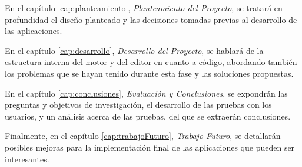 \medskip

En el capítulo \ref{cap:planteamiento}, \textit{Planteamiento del Proyecto}, se tratará en profundidad el diseño planteado y las decisiones tomadas previas al desarrollo de las aplicaciones.

\medskip

En el capítulo \ref{cap:desarrollo}, \textit{Desarrollo del Proyecto}, se hablará de la estructura interna del motor y del editor en cuanto a código, abordando también los problemas que se hayan tenido durante esta fase y las soluciones propuestas.

\medskip

En el capítulo \ref{cap:conclusiones}, \textit{Evaluación y Conclusiones}, se expondrán las preguntas y objetivos de investigación, el desarrollo de las pruebas con los usuarios, y un análisis acerca de las pruebas, del que se extraerán conclusiones.

\medskip

Finalmente, en el capítulo \ref{cap:trabajoFuturo}, \textit{Trabajo Futuro}, se detallarán posibles mejoras para la implementación final de las aplicaciones que pueden ser interesantes.